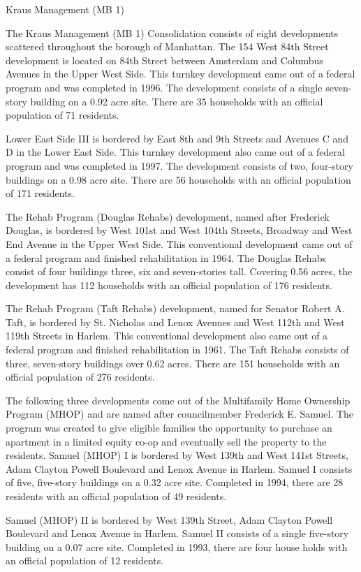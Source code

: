 Kraus Management (MB 1)

The Kraus Management (MB 1) Consolidation consists of eight developments scattered throughout the borough of Manhattan. The 154 West 84th Street development is located on 84th Street between Amsterdam and Columbus Avenues in the Upper West Side. This turnkey development came out of a federal program and was completed in 1996. The development consists of a single seven-story building on a 0.92 acre site. There are 35 households with an official population of 71 residents. 

Lower East Side III is bordered by East 8th and 9th Streets and Avenues C and D in the Lower East Side. This turnkey development also came out of a federal program and was completed in 1997. The development consists of two, four-story buildings on a 0.98 acre site. There are 56 households with an official population of 171 residents.

The Rehab Program (Douglas Rehabs) development, named after Frederick Douglas, is bordered by West 101st and West 104th Streets, Broadway and West End Avenue in the Upper West Side. This conventional development came out of a federal program and finished rehabilitation in 1964. The Douglas Rehabs consist of four buildings three, six and seven-stories tall. Covering 0.56 acres, the development has 112 households with an official population of 176 residents. 

The Rehab Program (Taft Rehabs) development, named for Senator Robert A. Taft, is bordered by St. Nicholas and Lenox Avenues and West 112th and West 119th Streets in Harlem. This conventional development also came out of a federal program and finished rehabilitation in 1961. The Taft Rehabs consists of three, seven-story buildings over 0.62 acres. There are 151 households with an official population of 276 residents.

The following three developments come out of the Multifamily Home Ownership Program (MHOP) and are named after councilmember Frederick E. Samuel. The program was created to give eligible families the opportunity to purchase an apartment in a limited equity co-op and eventually sell the property to the residents. Samuel (MHOP) I is bordered by West 139th and West 141st Streets, Adam Clayton Powell Boulevard and Lenox Avenue in Harlem. Samuel I consists of five, five-story buildings on a 0.32 acre site. Completed in 1994, there are 28 residents with an official population of 49 residents. 

Samuel (MHOP) II is bordered by West 139th Street, Adam Clayton Powell Boulevard and Lenox Avenue in Harlem. Samuel II consists of a single five-story building on a 0.07 acre site. Completed in 1993, there are four house holds with an official population of 12 residents.

